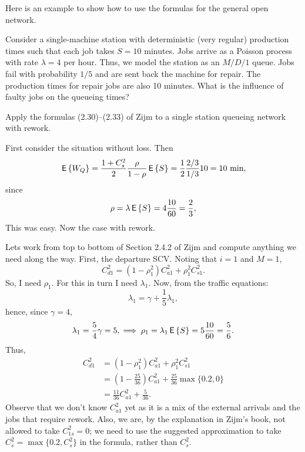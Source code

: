 \begin{question}
Here is an example to show how to use the formulas for the general open network.

Consider a single-machine station with deterministic (very regular)
production times such that each job takes $S=10$ minutes. Jobs arrive
as a Poisson process with rate $\lambda=4$ per hour. Thus, we model
the station as an $M/D/1$ queue. Jobs fail with probability $1/5$ and
are sent back the machine for repair. The production times for repair
jobs are also 10 minutes.  What is the influence of faulty jobs on the
queueing times? 

\begin{hint}
Apply the formulas (2.30)--(2.33) of Zijm to a single station
  queueing network with rework.
\end{hint}
\begin{solution}
  First consider the situation without loss. Then
  \begin{equation*}
    \,\mathsf{E}\left\{W_Q\right\} = \frac{1+C_s^2}2 \frac{\rho}{1-\rho} \,\mathsf{E}\left\{S\right\} = \frac 12 \frac{2/3}{1/3} 10 = 10 \text{ min},
  \end{equation*}
since 
\begin{equation*}
\rho=\lambda \,\mathsf{E}\left\{S\right\} = 4 \frac{10}{60} = \frac 23,
\end{equation*}
This was easy. Now the case with rework.

Lets work from top to bottom of Section 2.4.2 of Zijm and compute
anything we need along the way. First, the departure SCV. Noting that
$i=1$ and $M=1$,
\begin{equation*}
  C_{d1}^2 
= (1-\rho_1^2)C_{a1}^2 + \rho_1^2 C_{s1}^2.
\end{equation*}
So, I need $\rho_1$. For this in turn I need $\lambda_1$. Now, from the traffic equations:
\begin{equation*}
  \lambda_ 1= \gamma + \frac15\lambda_1, 
\end{equation*}
hence, since $\gamma=4$,
\begin{equation*}
\lambda_1 = \frac 5 4 \gamma=5, \implies \rho_1 = \lambda_1 \,\mathsf{E}\left\{S\right\}=5\frac{10}{60}=\frac 56.
\end{equation*}
Thus, 
\begin{equation*}
  \begin{split}
  C_{d1}^2  
&= (1-\rho_1^2)C_{a1}^2 + \rho_1^2 C_{s1}^2\\
&= (1-\frac{25}{36})C_{a1}^2 + \frac{25}{36}\max\{0.2, 0\}\\
&= \frac{11}{36}C_{a1}^2 + \frac{5}{36}.
  \end{split}
\end{equation*}
Observe that we don't know $C_{a1}^2$ yet as it is a mix of the
external arrivals and the jobs that require rework. Also, we are, by
the explanation in Zijm's book, not allowed to take $C_{1s}^2=0$; we
need to use the suggested approximation to take
$C_s^2 = \max\{0.2, C_s^2\}$ in the formula, rather than $C_s^2$.


\end{solution}
\end{question}
